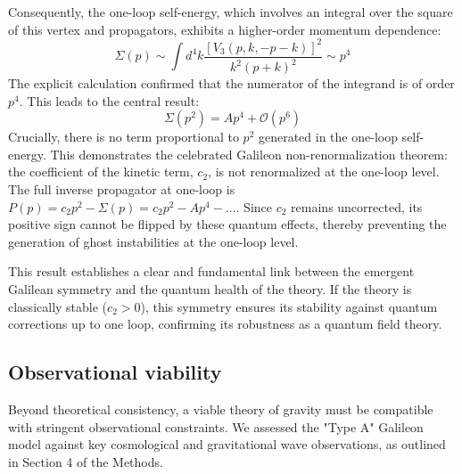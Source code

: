 \documentclass[twocolumn]{aastex631}
\begin{document}
Consequently, the one-loop self-energy, which involves an integral over the square of this vertex and propagators, exhibits a higher-order momentum dependence:
\begin{equation}
    \Sigma(p) \sim \int d^4k \frac{[V_3(p, k, -p-k)]^2}{k^2 (p+k)^2} \sim p^4
\end{equation}
The explicit calculation confirmed that the numerator of the integrand is of order $p^4$. This leads to the central result:
\begin{equation}
    \Sigma(p^2) = A p^4 + \mathcal{O}(p^6)
\end{equation}
Crucially, there is no term proportional to $p^2$ generated in the one-loop self-energy. This demonstrates the celebrated Galileon non-renormalization theorem: the coefficient of the kinetic term, $c_2$, is not renormalized at the one-loop level. The full inverse propagator at one-loop is $P(p) = c_2 p^2 - \Sigma(p) = c_2 p^2 - A p^4 - \dots$. Since $c_2$ remains uncorrected, its positive sign cannot be flipped by these quantum effects, thereby preventing the generation of ghost instabilities at the one-loop level.

This result establishes a clear and fundamental link between the emergent Galilean symmetry and the quantum health of the theory. If the theory is classically stable ($c_2 > 0$), this symmetry ensures its stability against quantum corrections up to one loop, confirming its robustness as a quantum field theory.

\subsection{Observational viability}
Beyond theoretical consistency, a viable theory of gravity must be compatible with stringent observational constraints. We assessed the "Type A" Galileon model against key cosmological and gravitational wave observations, as outlined in Section 4 of the Methods.
\end{document}
